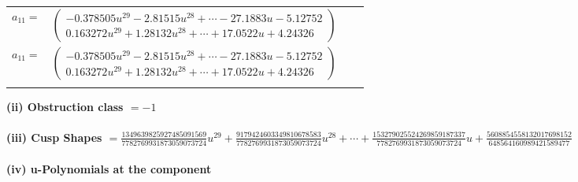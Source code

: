\documentclass[1p]{elsarticle_modified}
\theoremstyle{definition}
\begin{document}
\begin{tabular}{m{7pt} m{180pt} m{7pt} m{180pt} }
\flushright $a_{11}=$&$\begin{pmatrix}-0.378505 u^{29}-2.81515 u^{28}+\cdots-27.1883 u-5.12752\\0.163272 u^{29}+1.28132 u^{28}+\cdots+17.0522 u+4.24326\end{pmatrix}$\\ \flushright $a_{11}=$&$\begin{pmatrix}-0.378505 u^{29}-2.81515 u^{28}+\cdots-27.1883 u-5.12752\\0.163272 u^{29}+1.28132 u^{28}+\cdots+17.0522 u+4.24326\end{pmatrix}$\\&\end{tabular}
\flushleft \textbf{(ii) Obstruction class $= -1$}\\~\\
\flushleft \textbf{(iii) Cusp Shapes $= \frac{1349639825927485091569}{7782769931873059073724} u^{29}+\frac{9179424603349810678583}{7782769931873059073724} u^{28}+\cdots+\frac{153279025524269859187337}{7782769931873059073724} u+\frac{5608854558132017698152}{648564160989421589477}$}\\~\\
\newpage\renewcommand{\arraystretch}{1}
\flushleft \textbf{(iv) u-Polynomials at the component}\newline \\
\end{document}
